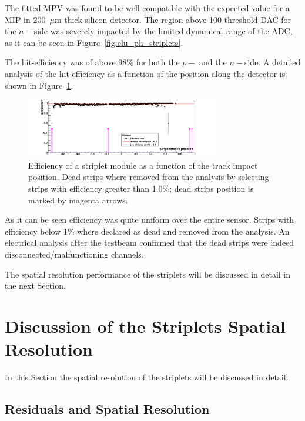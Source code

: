 The fitted MPV was found to be well compatible with the expected  value for a MIP in 200~$\mu$m 
thick silicon detector. The region above 100 threshold DAC for the $n-$side was severely impacted 
by the limited dynamical range of the ADC, as it can be seen in Figure~\ref{fig:clu_ph_striplets}.

The hit-efficiency was of above 98\% for both the $p-$ and the $n-$side. A detailed analysis 
of the hit-efficiency as a function of the position along the detector is shown in 
Figure~\ref{fig:striplets_eff}.
\begin{figure}[!htpb]
\centering
\includegraphics[width=0.75\textwidth]{striplets_eff.png}
\caption{\label{fig:striplets_eff}Efficiency of a striplet module as a function of the track impact position. 
Dead strips where removed from the analysis by selecting strips with efficiency greater than 1.0\%; 
dead strips position is marked by magenta arrows.}
\end{figure}

As it can be seen efficiency was quite uniform
over the entire sensor. Strips with efficiency below 1\% where declared as dead and removed from the 
analysis. An electrical analysis after the testbeam confirmed that  the dead strips 
were indeed disconnected/malfunctioning channels. 

The spatial resolution performance of the striplets will be discussed in detail in the next Section.

\section{Discussion of the Striplets Spatial Resolution}
\label{sec:striplets_res}

In this Section the spatial resolution of the striplets will be discussed in detail. 

\subsection{Residuals and Spatial Resolution}

